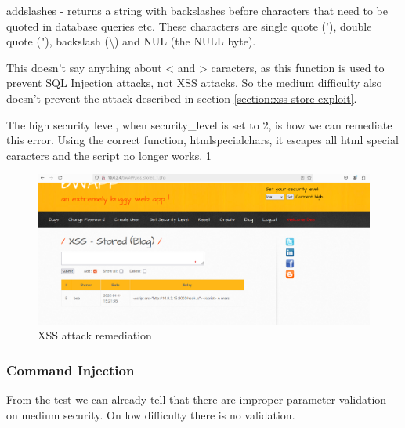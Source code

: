 \documentclass{article}
\begin{document}
addslashes - returns a string with backslashes before characters that need to be quoted in database queries etc.
These characters are single quote ('), double quote ("), backslash (\textbackslash) and NUL (the NULL byte).


This doesn't say anything about < and > caracters, as this function is used to prevent SQL Injection attacks, not XSS attacks.
So the medium difficulty also doesn't prevent the attack described in section \ref{section:xss-store-exploit}.

The high security level, when security\_level is set to 2, is how we can remediate this error.
Using the correct function, htmlspecialchars, it escapes all html special caracters and the script no longer works. \ref{fig:no-longer-works}

\begin{figure}
    \centering
    \includegraphics[width=1\linewidth]{Figures/beef/no-longer-works.png}
    \caption{\label{fig:no-longer-works}XSS attack remediation}
\end{figure}

\subsubsection{Command Injection}
From the test we can already tell that there are improper parameter validation on medium security. On low difficulty there is no validation.
\end{document}
